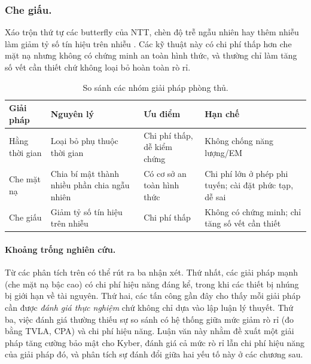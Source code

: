 \documentclass[../LuanVan.tex]{subfiles}
\begin{document}
\subsubsection{Che giấu.} Xáo trộn thứ tự các butterfly của NTT, chèn độ trễ ngẫu nhiên hay thêm nhiễu làm giảm tỷ số tín hiệu trên nhiễu \cite{MangardOP07}. Các kỹ thuật này có chi phí thấp hơn che mặt nạ nhưng không có chứng minh an toàn hình thức, và thường chỉ làm tăng số vết cần thiết chứ không loại bỏ hoàn toàn rò rỉ.

\begin{table}[H]
\centering
\caption{So sánh các nhóm giải pháp phòng thủ.}
\label{tab:defense}
\begin{tabular}{p{2.8cm}|p{3.8cm}|p{3.8cm}|p{3.4cm}}
\hline
\textbf{Giải pháp} & \textbf{Nguyên lý} & \textbf{Ưu điểm} & \textbf{Hạn chế} \\ \hline
Hằng thời gian & Loại bỏ phụ thuộc thời gian & Chi phí thấp, dễ kiểm chứng & Không chống năng lượng/EM \\ \hline
Che mặt nạ & Chia bí mật thành nhiều phần chia ngẫu nhiên & Có cơ sở an toàn hình thức & Chi phí lớn ở phép phi tuyến; cài đặt phức tạp, dễ sai \\ \hline
Che giấu & Giảm tỷ số tín hiệu trên nhiễu & Chi phí thấp & Không có chứng minh; chỉ tăng số vết cần thiết \\ \hline
\end{tabular}
\end{table}

\paragraph{Khoảng trống nghiên cứu.} Từ các phân tích trên có thể rút ra ba nhận xét. Thứ nhất, các giải pháp mạnh (che mặt nạ bậc cao) có chi phí hiệu năng đáng kể, trong khi các thiết bị nhúng bị giới hạn về tài nguyên. Thứ hai, các tấn công gần đây \cite{Hamburg21,Dubrova23} cho thấy mỗi giải pháp cần được \textit{đánh giá thực nghiệm} chứ không chỉ dựa vào lập luận lý thuyết. Thứ ba, việc đánh giá thường thiếu sự so sánh có hệ thống giữa mức giảm rò rỉ (đo bằng TVLA, CPA) và chi phí hiệu năng. Luận văn này nhằm đề xuất một giải pháp tăng cường bảo mật cho Kyber, đánh giá cả mức rò rỉ lẫn chi phí hiệu năng của giải pháp đó, và phân tích sự đánh đổi giữa hai yếu tố này ở các chương sau.
\end{document}
